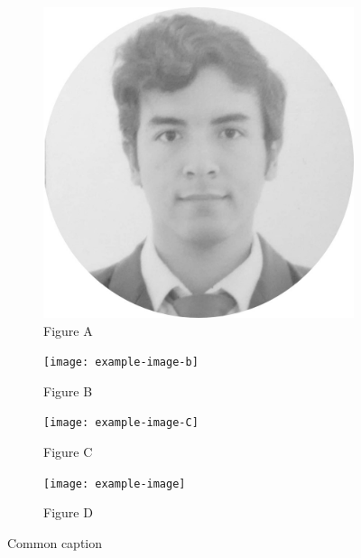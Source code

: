 \documentclass[twoside,twocolumn]{article}
\begin{document}
    \begin{figure}[b]
\begin{subfigure}{0.48\linewidth}
    \includegraphics[scale = 0.5]{justme.jpg}
\caption{Figure A}
    \label{fig:a}
\end{subfigure}
    \hfill
\begin{subfigure}{0.48\linewidth}
    \texttt{[image: example-image-b]}
\caption{Figure B}
    \label{fig:b}
\end{subfigure}

\begin{subfigure}{0.48\linewidth}
    \texttt{[image: example-image-C]}
\caption{Figure C}
    \label{fig:c}
\end{subfigure}
    \hfill
\begin{subfigure}{0.48\linewidth}
    \texttt{[image: example-image]}
\caption{Figure D}
    \label{fig:d}
\end{subfigure}
\caption{Common caption}
\lipsum[11]
\end{figure}
\lipsum*[2-5]
\end{document}

